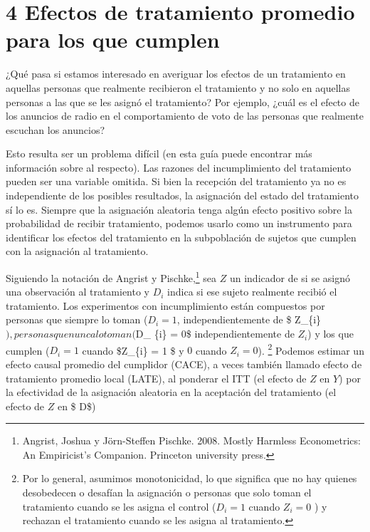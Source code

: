 \documentclass[
]{article}
\begin{document}
\hypertarget{efectos-de-tratamiento-promedio-para-los-que-cumplen}{%
\section{4 Efectos de tratamiento promedio para los que
cumplen}\label{efectos-de-tratamiento-promedio-para-los-que-cumplen}}

¿Qué pasa si estamos interesado en averiguar los efectos de un
tratamiento en aquellas personas que realmente recibieron el tratamiento
y no solo en aquellas personas a las que se les asignó el tratamiento?
Por ejemplo, ¿cuál es el efecto de los anuncios de radio en el
comportamiento de voto de las personas que realmente escuchan los
anuncios?

Esto resulta ser un problema difícil (en esta guía puede encontrar más
información sobre al respecto). Las razones del incumplimiento del
tratamiento pueden ser una variable omitida. Si bien la recepción del
tratamiento ya no es independiente de los posibles resultados, la
asignación del estado del tratamiento sí lo es. Siempre que la
asignación aleatoria tenga algún efecto positivo sobre la probabilidad
de recibir tratamiento, podemos usarlo como un instrumento para
identificar los efectos del tratamiento en la subpoblación de sujetos
que cumplen con la asignación al tratamiento.

Siguiendo la notación de Angrist y Pischke,\footnote{Angrist, Joshua y
  Jörn-Steffen Pischke. 2008. Mostly Harmless Econometrics: An
  Empiricist's Companion. Princeton university press.} sea \(Z\) un
indicador de si se asignó una observación al tratamiento y \(D_{i}\)
indica si ese sujeto realmente recibió el tratamiento. Los experimentos
con incumplimiento están compuestos por personas que siempre lo toman
(\(D_{i} = 1\), independientemente de \$
Z\_\{i\}\(), personas que nunca lo toman (\)D\_ \{i\} = 0\$
independientemente de \(Z_ {i}\)) y los que cumplen (\(D_ {i} = 1\)
cuando \$Z\_\{i\} = 1 \$ y \(0\) cuando \(Z_ {i} = 0\)). \footnote{Por
  lo general, asumimos monotonicidad, lo que significa que no hay
  quienes desobedecen o desafían la asignación o personas que solo toman
  el tratamiento cuando se les asigna el control (\(D_{i} = 1\) cuando
  \(Z_i = 0\) ) y rechazan el tratamiento cuando se les asigna al
  tratamiento.} Podemos estimar un efecto causal promedio del cumplidor
(CACE), a veces también llamado efecto de tratamiento promedio local
(LATE), al ponderar el ITT (el efecto de \(Z\) en \(Y\)) por la
efectividad de la asignación aleatoria en la aceptación del tratamiento
(el efecto de \(Z\) en \$ D\$)
\end{document}
